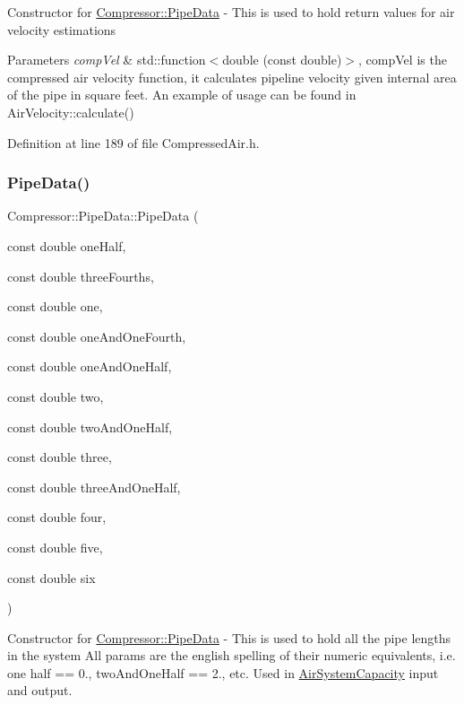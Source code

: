 Constructor for \hyperlink{struct_compressor_1_1_pipe_data}{Compressor\+::\+Pipe\+Data} -\/ This is used to hold return values for air velocity estimations 
\begin{DoxyParams}{Parameters}
{\em comp\+Vel} & std\+::function$<$double (const double)$>$, comp\+Vel is the compressed air velocity function, it calculates pipeline velocity given internal area of the pipe in square feet. An example of usage can be found in Air\+Velocity\+::calculate() \\
\hline
\end{DoxyParams}


Definition at line 189 of file Compressed\+Air.\+h.

\mbox{\label{struct_compressor_1_1_pipe_data_a71acdc81e25bd90b51361bf8d4f0ed38}} 
\subsubsection{\texorpdfstring{Pipe\+Data()}{PipeData()}\hspace{0.1cm}{\footnotesize\ttfamily [5/6]}}
{\footnotesize\ttfamily Compressor\+::\+Pipe\+Data\+::\+Pipe\+Data (\begin{DoxyParamCaption}\item[{const double}]{one\+Half,  }\item[{const double}]{three\+Fourths,  }\item[{const double}]{one,  }\item[{const double}]{one\+And\+One\+Fourth,  }\item[{const double}]{one\+And\+One\+Half,  }\item[{const double}]{two,  }\item[{const double}]{two\+And\+One\+Half,  }\item[{const double}]{three,  }\item[{const double}]{three\+And\+One\+Half,  }\item[{const double}]{four,  }\item[{const double}]{five,  }\item[{const double}]{six }\end{DoxyParamCaption})\hspace{0.3cm}{\ttfamily [inline]}}

Constructor for \hyperlink{struct_compressor_1_1_pipe_data}{Compressor\+::\+Pipe\+Data} -\/ This is used to hold all the pipe lengths in the system All params are the english spelling of their numeric equivalents, i.\+e. one half == 0., two\+And\+One\+Half == 2., etc. Used in \hyperlink{class_compressor_1_1_air_system_capacity}{Air\+System\+Capacity} input and output. 

